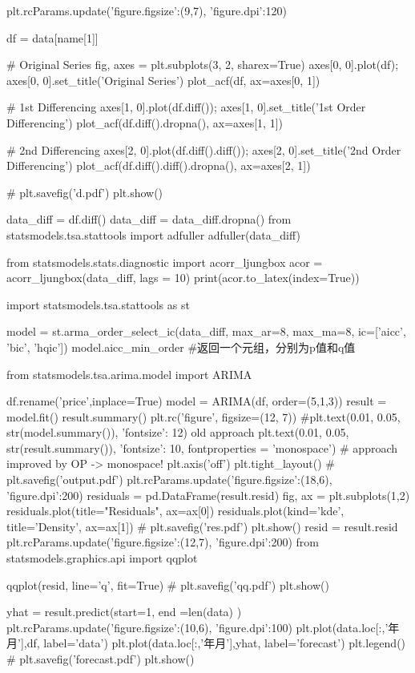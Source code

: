 \documentclass[a4paper,AutoFakeBold,AutoFakeSlant]{ctexart}
\begin{document}
\begin{python}
  plt.rcParams.update({'figure.figsize':(9,7), 'figure.dpi':120})

  df = data[name[1]]

  # Original Series
  fig, axes = plt.subplots(3, 2, sharex=True)
  axes[0, 0].plot(df); axes[0, 0].set_title('Original Series')
  plot_acf(df, ax=axes[0, 1])

  # 1st Differencing
  axes[1, 0].plot(df.diff()); axes[1, 0].set_title('1st Order Differencing')
  plot_acf(df.diff().dropna(), ax=axes[1, 1])

  # 2nd Differencing
  axes[2, 0].plot(df.diff().diff()); axes[2, 0].set_title('2nd Order Differencing')
  plot_acf(df.diff().diff().dropna(), ax=axes[2, 1])

  # plt.savefig('d.pdf')
  plt.show()

  data_diff = df.diff()
  data_diff = data_diff.dropna()
  from statsmodels.tsa.stattools import adfuller
  adfuller(data_diff)

  from statsmodels.stats.diagnostic import acorr_ljungbox
  acor = acorr_ljungbox(data_diff, lags = 10)
  print(acor.to_latex(index=True))
\end{python}

\begin{python}
  import statsmodels.tsa.stattools as st

  model = st.arma_order_select_ic(data_diff, max_ar=8, max_ma=8, ic=['aicc', 'bic', 'hqic'])
  model.aicc_min_order #返回一个元组，分别为p值和q值
\end{python}

\begin{python}
  from statsmodels.tsa.arima.model import ARIMA

  df.rename('price',inplace=True)
  model = ARIMA(df, order=(5,1,3))
  result = model.fit()
  result.summary()
  plt.rc('figure', figsize=(12, 7))
  #plt.text(0.01, 0.05, str(model.summary()), {'fontsize': 12}) old approach
  plt.text(0.01, 0.05, str(result.summary()), {'fontsize': 10}, fontproperties = 'monospace') # approach improved by OP -> monospace!
  plt.axis('off')
  plt.tight_layout()
  # plt.savefig('output.pdf')
  plt.rcParams.update({'figure.figsize':(18,6), 'figure.dpi':200})
  residuals = pd.DataFrame(result.resid)
  fig, ax = plt.subplots(1,2)
  residuals.plot(title="Residuals", ax=ax[0])
  residuals.plot(kind='kde', title='Density', ax=ax[1])
  # plt.savefig('res.pdf')
  plt.show()
  resid = result.resid
  plt.rcParams.update({'figure.figsize':(12,7), 'figure.dpi':200})
  from statsmodels.graphics.api import qqplot

  qqplot(resid, line='q', fit=True)
  # plt.savefig('qq.pdf')
  plt.show()

  yhat = result.predict(start=1, end =len(data) )
  plt.rcParams.update({'figure.figsize':(10,6), 'figure.dpi':100})
  plt.plot(data.loc[:,'年月'],df, label='data')
  plt.plot(data.loc[:,'年月'],yhat, label='forecast')
  plt.legend()
  # plt.savefig('forecast.pdf')
plt.show()
\end{python}
\end{document}
